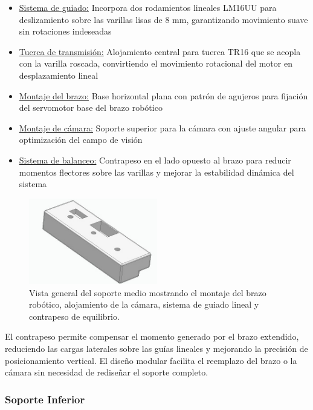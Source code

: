 \begin{itemize}[label=$\bullet$]
    \item \underline{Sistema de guiado:} Incorpora dos rodamientos lineales LM16UU para deslizamiento sobre las varillas lisas de 8 mm, garantizando movimiento suave sin rotaciones indeseadas
    \item \underline{Tuerca de transmisión:} Alojamiento central para tuerca TR16 que se acopla con la varilla roscada, convirtiendo el movimiento rotacional del motor en desplazamiento lineal
    \item \underline{Montaje del brazo:} Base horizontal plana con patrón de agujeros para fijación del servomotor base del brazo robótico
    \item \underline{Montaje de cámara:} Soporte superior para la cámara con ajuste angular para optimización del campo de visión
    \item \underline{Sistema de balanceo:} Contrapeso en el lado opuesto al brazo para reducir momentos flectores sobre las varillas y mejorar la estabilidad dinámica del sistema
\end{itemize}

\begin{figure}[H]
    \centering
    \includegraphics[width=0.5\textwidth]{img/MedioReal_simplificado_vista.jpg}
    \caption{Vista general del soporte medio mostrando el montaje del brazo robótico, alojamiento de la cámara, sistema de guiado lineal y contrapeso de equilibrio.}
    \label{fig:soporte_medio_Real}
\end{figure}

El contrapeso permite compensar el momento generado por el brazo extendido, reduciendo las cargas laterales sobre las guías lineales y mejorando la precisión de posicionamiento vertical. El diseño modular facilita el reemplazo del brazo o la cámara sin necesidad de rediseñar el soporte completo.

\subsubsection{Soporte Inferior}

